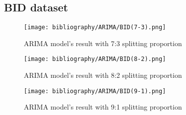 \documentclass{ieeeojies}
\begin{document}
\subsection{BID dataset} 


\begin{figure}[H]
  \centering
  \begin{minipage}{0.8\linewidth}
    \centering
    \texttt{[image: bibliography/ARIMA/BID(7-3).png]}
    \caption{ARIMA model's result with 7:3 splitting proportion}
    \label{fig8}
  \end{minipage}
\end{figure}

\begin{figure}[H]
  \centering
  \begin{minipage}{0.8\linewidth}
    \centering
    \texttt{[image: bibliography/ARIMA/BID(8-2).png]}
    \caption{ARIMA model's result with 8:2 splitting proportion}
    \label{fig8}
  \end{minipage}
\end{figure}

\begin{figure}[H]
  \centering
  \begin{minipage}{0.8\linewidth}
    \centering
    \texttt{[image: bibliography/ARIMA/BID(9-1).png]}
    \caption{ARIMA model's result with 9:1 splitting proportion}
    \label{fig8}
  \end{minipage}
\end{figure}

\end{document}
